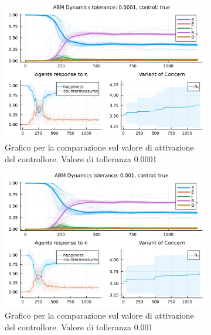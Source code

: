 \begin{figure}[!hb]
	\centering
	\begin{subfigure}[b]{0.45\textwidth}
		\centering
		\includegraphics[width=\textwidth]{img/SocialNetworkABM_1_TOL.jpg}
		\caption{Grafico per la comparazione sul valore di attivazione del controllore. Valore di tolleranza 0.0001}
		\label{fig:comparison_tol_1e-4}
	\end{subfigure}
	\hfill
	\begin{subfigure}[b]{0.45\textwidth}
		\centering
		\includegraphics[width=\textwidth]{img/SocialNetworkABM_2_TOL.jpg}
		\caption{Grafico per la comparazione sul valore di attivazione del controllore. Valore di tolleranza 0.001}
		\label{fig:comparison_tol_1e-3}
	\end{subfigure}
	\hfill
	\begin{subfigure}[b]{0.45\textwidth}
		\centering

\end{subfigure}
\end{figure}

